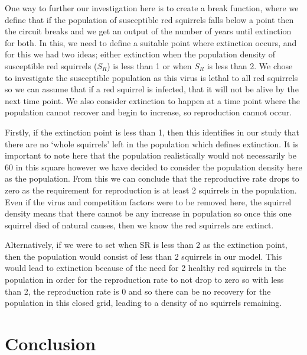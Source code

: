 \documentclass{article}
\begin{document}
One way to further our investigation here is to create a break function, where we define that if the population of susceptible red squirrels falls below a point then the circuit breaks and we get an output of the number of years until extinction for both. In this, we need to define a suitable point where extinction occurs, and for this we had two ideas; either extinction when the population density of susceptible red squirrels ($S_{R}$) is less than 1 or when $S_{R}$ is less than 2. We chose to investigate the susceptible population as this virus is lethal to all red squirrels so we can assume that if a red squirrel is infected, that it will not be alive by the next time point. We also consider extinction to happen at a time point where the population cannot recover and begin to increase, so reproduction cannot occur. 

Firstly, if the extinction point is less than 1, then this identifies in our study that there are no ‘whole squirrels’ left in the population which defines extinction. It is important to note here that the population realistically would not necessarily be 60 in this square however we have decided to consider the population density here as the population. From this we can conclude that the reproductive rate drops to zero as the requirement for reproduction is at least 2 squirrels in the population. Even if the virus and competition factors were to be removed here, the squirrel density means that there cannot be any increase in population so once this one squirrel died of natural causes, then we know the red squirrels are extinct. 

Alternatively, if we were to set when SR is less than 2 as the extinction point, then the population would consist of less than 2 squirrels in our model. This would lead to extinction because of the need for 2 healthy red squirrels in the population in order for the reproduction rate to not drop to zero so with less than 2, the reproduction rate is 0 and so there can be no recovery for the population in this closed grid, leading to a density of no squirrels remaining. 



\section{Conclusion}
\end{document}
